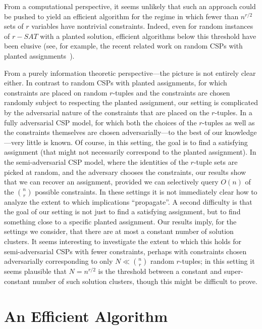 \documentclass[final,12pt]{colt2018}
\begin{document}
From a computational perspective, it seems unlikely that such an approach could be pushed to yield an efficient algorithm for the regime in which fewer than $n^{r/2}$ sets of $r$ variables have nontrivial constraints.  Indeed, even for random instances of $r-SAT$ with a planted solution, efficient algorithms below this threshold have been elusive (see, for example, the recent related work on random CSPs with planted assignments~\citep{feldman2015complexity,raghavendra2016strongly}).   


From a purely information theoretic perspective---the picture is not entirely clear either.  In contrast to random CSPs with planted assignments, for which constraints are placed on random $r$-tuples and the constraints are chosen randomly subject to respecting the planted assignment, our setting is complicated by the adversarial nature of the constraints that are placed on the $r$-tuples.  In a fully adversarial CSP model, for which both the choices of the $r$-tuples as well as the constraints themselves are chosen adversarially---to the best of our knowledge---very little is known.  Of course, in this setting, the goal is to find a satisfying assignment (that might not necessarily correspond to the planted assignment).  In the semi-adversarial CSP model, where the identities of the $r$-tuple sets are picked at random, and the adversary chooses the constraints, our results show that we can recover an assignment, provided we can selectively query $O(n)$ of the ${n \choose r}$ possible constraints.  In these settings it is not immediately clear how to analyze the extent to which implications ``propagate''.  A second difficulty is that the goal of our setting is not just to find a satisfying assignment, but to find something close to a specific planted assignment.  Our results imply, for the settings we consider, that there are at most a constant number of solution clusters.  It seems interesting to investigate  the extent to which this holds for semi-adversarial CSPs with fewer constraints, perhaps with constraints chosen adversarially corresponding to only $N \ll {n \choose r}$ random $r$-tuples; in this setting it seems plausible that $N = n^{r/2}$ is the threshold between a constant and super-constant number of such solution clusters, though this might be difficult to prove.  

%

\appendix

\section{An Efficient Algorithm}\label{sec:realAlg}
\end{document}
